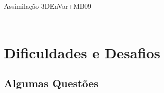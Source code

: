 \documentclass[10pt,aspectratio=169]{beamer}
\begin{document}
\begin{frame}{Assimilação 3DEnVar+MB09}
\begin{columns}[t]
\begin{column}{.5\textwidth}
\begin{figure}[H]
        \pause
        \pause
			\end{figure}
    \end{column}
  \end{columns}
\end{frame}

\section{Dificuldades e Desafios}

\subsection{Algumas Questões}
\end{document}
